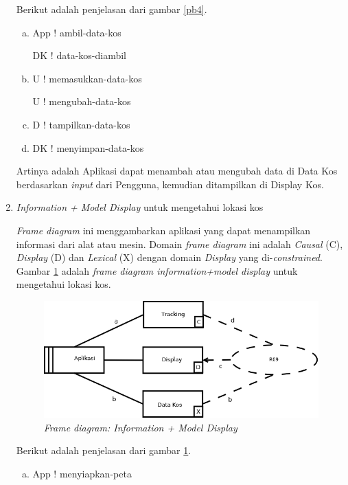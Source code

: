 \begin{enumerate}[-]
			Berikut adalah penjelasan dari gambar \ref{pb4}.
			
			\begin{enumerate}[a.]
				\item App ! ambil-data-kos
				
				DK ! data-kos-diambil
				
				\item U ! memasukkan-data-kos
				
				U ! mengubah-data-kos
				
				\item D ! tampilkan-data-kos
				\item DK ! menyimpan-data-kos
			\end{enumerate}
		
		Artinya adalah Aplikasi dapat menambah atau mengubah data di Data Kos berdasarkan \textit{input} dari Pengguna, kemudian ditampilkan di Display Kos.
		
			\item \textit{Information + Model Display} untuk mengetahui lokasi kos
			
			\textit{Frame diagram} ini menggambarkan aplikasi yang dapat menampilkan informasi dari alat atau mesin. Domain \textit{frame diagram} ini adalah \textit{Causal} (C), \textit{Display} (D) dan \textit{Lexical} (X) dengan domain \textit{Display} yang di-\textit{constrained}. Gambar \ref{pb5} adalah \textit{frame diagram information+model display} untuk mengetahui lokasi kos.
			
			\begin{figure}[H]
				\centering
				\includegraphics[scale=0.4]{gambar/5}
				\caption{\textit{Frame diagram: Information + Model Display}}
				\label{pb5}
			\end{figure}
			
			Berikut adalah penjelasan dari gambar \ref{pb5}.
			
			\begin{enumerate}[a.]
				\item App ! menyiapkan-peta
				

\end{enumerate}
\end{enumerate}
